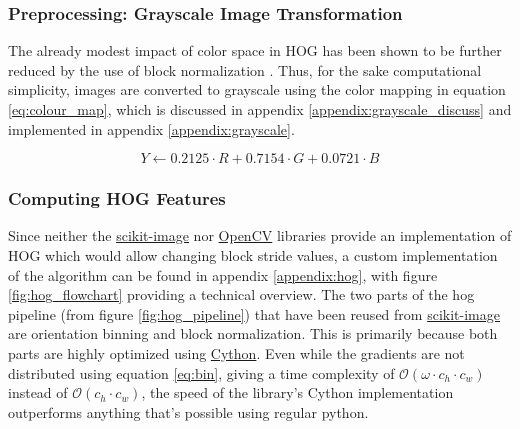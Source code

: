 \subsubsection{Preprocessing: Grayscale Image Transformation}

The already modest impact of color space in HOG has been shown to be further reduced by the use of block normalization \cite{dalal_2005_histograms}. Thus, for the sake computational simplicity, images are converted to grayscale \cite{madk_2008_perceptual} using the color mapping in equation \ref{eq:colour_map}, which is discussed in appendix \ref{appendix:grayscale_discuss} and implemented in appendix \ref{appendix:grayscale}.

\begin{equation}\label{eq:colour_map}
    Y \leftarrow 0.2125 \cdot R + 0.7154 \cdot G + 0.0721 \cdot B
\end{equation}

\subsubsection{Computing HOG Features}

Since neither the \href{https://scikit-image.org/}{scikit-image} nor \href{https://opencv.org/}{OpenCV} libraries provide an implementation of HOG which would allow changing block stride values, a custom implementation of the algorithm can be found in appendix \ref{appendix:hog}, with figure \ref{fig:hog_flowchart} providing a technical overview. The two parts of the hog pipeline (from figure \ref{fig:hog_pipeline}) that have been reused from \href{https://scikit-image.org/}{scikit-image} are orientation binning and block normalization. This is primarily because both parts are highly optimized using \href{https://cython.org/}{Cython}. Even while the gradients are not distributed using equation \ref{eq:bin}, giving a time complexity of $\mathcal{O}(\omega \cdot c_h \cdot c_w)$ instead of $\mathcal{O}(c_h \cdot c_w)$, the speed of the library's Cython implementation outperforms anything that's possible using regular python.

